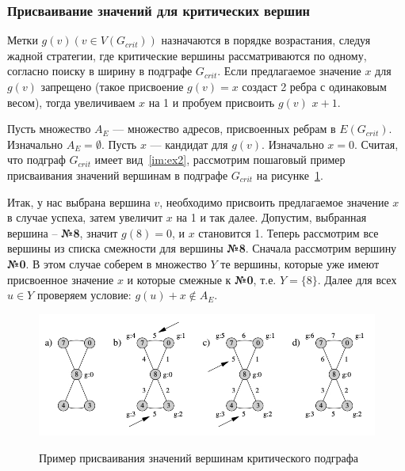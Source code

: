 \documentclass[specialist,
               substylefile = spbu.rtx,
               subf,href,colorlinks=true, 12pt]{disser}
\begin{document}
\subsubsection{Присваивание значений для критических вершин}

Метки $g(v) (v \in V(G_{crit}))$ назначаются в порядке возрастания, следуя жадной стратегии, где критические вершины рассматриваются по одному, согласно поиску в ширину в подграфе $G_{crit}$. Если предлагаемое значение $x$ для $g(v)$ запрещено (такое присвоение $g(v) = x$ создаст 2 ребра с одинаковым весом), тогда увеличиваем $x$ на 1 и пробуем присвоить $g(v)$ $x+1$.

Пусть множество $A_E$ --- множество адресов, присвоенных ребрам в $E(G_{crit})$. Изначально $A_E = \emptyset$. Пусть $x$ --- кандидат для $g(v)$. Изначально $x = 0$. Считая, что подграф $G_{crit}$ имеет вид~\ref{im:ex2}, рассмотрим пошаговый пример присваивания значений вершинам в подграфе $G_{crit}$ на рисунке~\ref{im:ex3}.

Итак, у нас выбрана вершина $v$, необходимо присвоить предлагаемое значение $x$ в случае успеха, затем увеличит $x$ на 1 и так далее. Допустим, выбранная вершина -- \textbf{№8}, значит $g(8) = 0$, и $x$ становится 1. Теперь рассмотрим все вершины из списка смежности для вершины \textbf{№8}. Сначала рассмотрим вершину \textbf{№0}. В этом случае соберем в множество $Y$ те вершины, которые уже имеют присвоенное значение $x$ и которые смежные к \textbf{№0}, т.е. $Y = \{8\}$. Далее для всех $u \in Y$ проверяем условие: $g(u) + x \notin A_E$.

\begin{figure}[h]
\begin{center}
\includegraphics[scale=0.35]{imgs/ex3.jpg}\label{im:ex3}
\caption{Пример присваивания значений вершинам критического подграфа}
\end{center}
\end{figure}
\end{document}
